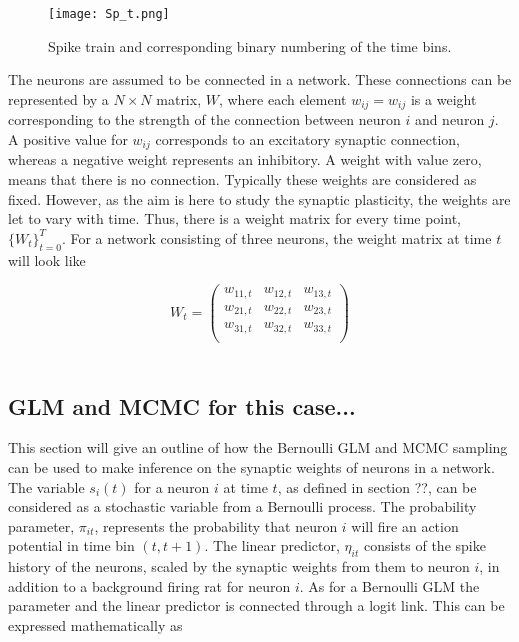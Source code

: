 \begin{figure}[h]
\caption{Spike train and corresponding binary numbering of the time bins.}
\label{fig:spike_train}
    \centering
    \texttt{[image: Sp\_t.png]}
\end{figure} 

The neurons are assumed to be connected in a network. These connections can be represented by a $N \times N$ matrix, $W$, where each element $w_{ij}=w_{ij}$ is a weight corresponding to the strength of the connection between neuron $i$ and neuron $j$. A positive value for $w_{ij}$ corresponds to an excitatory synaptic connection, whereas a negative weight represents an inhibitory. A weight with value zero, means that there is no connection. 
Typically these weights are considered as fixed. However, as the aim is here to study the synaptic plasticity, the weights are let to vary with time. Thus, there is a weight matrix for every time point, $\{W_t\}_{t=0}^{T}$. For a network consisting of three neurons, the weight matrix at time $t$ will look like

\begin{equation*}
W_t = 
\begin{pmatrix}
w_{11,t} & w_{12,t} & w_{13,t}\\
w_{21,t} & w_{22,t} & w_{23,t}\\
w_{31,t} & w_{32,t} & w_{33,t}\\
\end{pmatrix} 
\end{equation*}
\\

\subsection{GLM and MCMC for this case...}
This section will give an outline of how the Bernoulli GLM and MCMC sampling can be used to make inference on the synaptic weights of neurons in a network. The variable $s_i(t)$ for a neuron $i$ at time $t$, as defined in section ??, can be considered as a stochastic variable from a Bernoulli process. The probability parameter, $\pi_{it}$, represents the probability that neuron $i$ will fire an action potential in time bin $(t,t+1)$. The linear predictor, $\eta_{it}$ consists of the spike history of the neurons, scaled by the synaptic weights from them to neuron $i$, in addition to a background firing rat for neuron $i$. As for a Bernoulli GLM the parameter and the linear predictor is connected through a logit link. This can be expressed mathematically as

